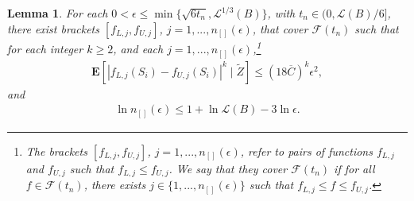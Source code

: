 \documentclass[12pt, fullpage]{amsart}
\newtheorem{lemma}{Lemma}[section]
\theoremstyle{definition}
\theoremstyle{definition}
\theoremstyle{definition}
\begin{document}
\begin{bibunit}[econometrica]
\begin{lemma}
	\label{lemm: bracketing}
	For each $0 < \epsilon \le \min\{\sqrt{6 t_n},\mathcal{L}^{1/3}(B)\}$, with $t_n \in (0, \mathcal{L}(B)/6]$, there exist brackets $[f_{L,j},f_{U,j}]$, $j=1,...,n_{[]}(\epsilon)$, that cover $\mathcal{F}(t_n)$ such that for each integer $k \ge 2$, and each $j=1,...,n_{[]}(\epsilon)$,\footnote{The brackets $[f_{L,j},f_{U,j}]$, $j=1,...,n_{[]}(\epsilon)$, refer to pairs of functions $f_{L,j}$ and $f_{U,j}$ such that $f_{L,j} \le f_{U,j}$. We say that they cover $\mathcal{F}(t_n)$ if for all $f \in \mathcal{F}(t_n)$, there exists $j \in \{1,...,n_{[]}(\epsilon)\}$ such that $f_{L,j} \le f \le f_{U,j}$.} 
	\begin{align}
		\label{bound3456}
		\mathbf{E}\left[ \left| f_{L,j}(S_i) - f_{U,j}(S_i) \right|^k \mid \tilde Z \right] \le (18 \overline C)^k \epsilon^2,
	\end{align}
and
\begin{align}
	\label{bound23}
	\ln n_{[]}(\epsilon) \le 1 + \ln \mathcal{L}(B) - 3\ln \epsilon.
\end{align}
\end{lemma}


\end{bibunit}
\end{document}
